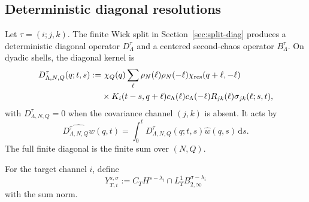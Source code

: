 \documentclass[11pt,reqno]{amsart}
\numberwithin{equation}{section}
\theoremstyle{plain}
\theoremstyle{definition}
\newcommand{\dd}{\,\mathrm d}
\begin{document}
\subsection{Deterministic diagonal resolutions}\label{subsec:contraction-resolution}
Let \(\tau=(i;j,k)\).  The finite Wick split in Section~\ref{sec:split-diag} produces a deterministic diagonal operator \(D^\tau_\Lambda\) and a centered second-chaos operator \(B^\tau_\Lambda\).  On dyadic shells, the diagonal kernel is
\begin{equation}\label{eq:D-formulation}
\begin{aligned}
        D_{\Lambda,N,Q}^{\tau}(q;t,s)
        :=&\ \chi_Q(q)
        \sum_\ell \rho_N(\ell)\rho_N(-\ell)\chi_{\rm res}(q+\ell,-\ell)\\
        &\times K_i(t-s,q+\ell)c_\Lambda(\ell)c_\Lambda(-\ell)
        R_{jk}(\ell)\sigma_{jk}(\ell;s,t),
\end{aligned}
\end{equation}
with \(D_{\Lambda,N,Q}^{\tau}=0\) when the covariance channel \((j,k)\) is absent.  It acts by
\begin{equation}\label{eq:D-action-formulation}
        \widehat{D^\tau_{\Lambda,N,Q}w}(q,t)
        =\int_0^tD^\tau_{\Lambda,N,Q}(q;t,s)\widehat w(q,s)\dd s .
\end{equation}
The full finite diagonal is the finite sum over \((N,Q)\).

For the target channel \(i\), define
\begin{equation}\label{eq:Y-space}
        Y_{T,i}^{s,\sigma}
        :=C_TH^{s-\lambda_i}\cap L_T^1B^{\sigma-\lambda_i}_{2,\infty}
\end{equation}
with the sum norm.
\end{document}
